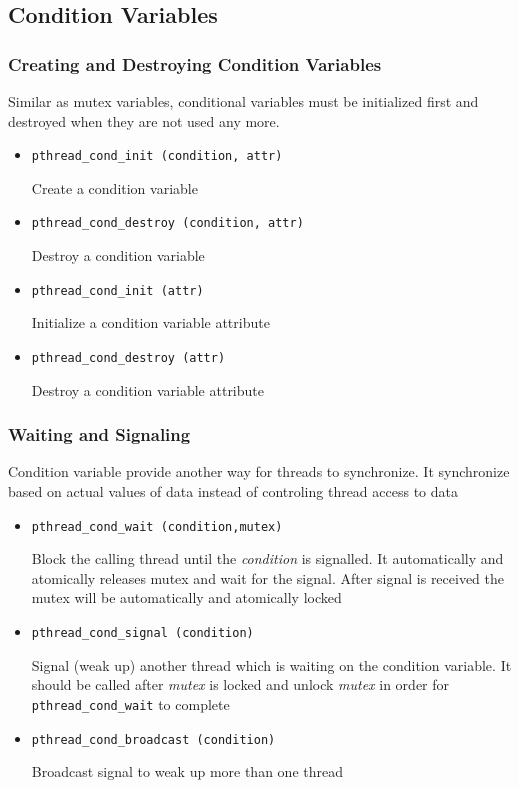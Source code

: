 \subsection{Condition Variables}
\subsubsection{Creating and Destroying Condition Variables}
Similar as mutex variables, conditional variables must be initialized first and
destroyed when they are not used any more.

\begin{itemize}
  \item \texttt{pthread\_cond\_init (condition, attr)}
  
  Create a condition variable

  \item \texttt{pthread\_cond\_destroy (condition, attr)}
  
  Destroy a condition variable
   
  \item \texttt{pthread\_cond\_init (attr)}
  
  Initialize a condition variable attribute
   
  \item \texttt{pthread\_cond\_destroy (attr)}
  
  Destroy a condition variable attribute 
\end{itemize}

\subsubsection{Waiting and Signaling}
Condition variable provide another way for threads to synchronize. It
synchronize based on actual values of data instead of
controling thread access to data
\begin{itemize}
  \item \texttt{pthread\_cond\_wait (condition,mutex)}
  
  Block the calling thread until the \emph{condition} is signalled.
  It automatically and atomically releases mutex and wait for the signal.
  After signal is received the mutex will be automatically and atomically
  locked 
  
  \item  \texttt{pthread\_cond\_signal (condition)}
  
  Signal (weak up) another thread which is waiting on the condition variable.
  It should be called after \emph{mutex} is locked and unlock \emph{mutex} in
  order for \texttt{pthread\_cond\_wait} to complete
  
  \item \texttt{pthread\_cond\_broadcast (condition)}
  
  Broadcast signal to weak up more than one thread 
\end{itemize}






%

%
